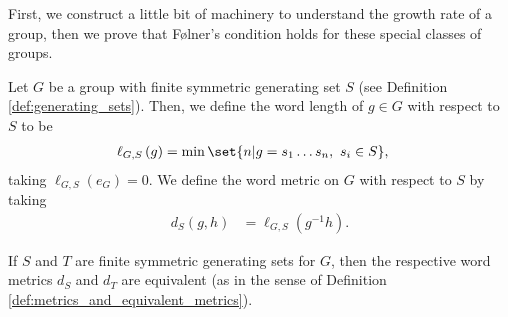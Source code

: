 \documentclass[10pt]{mypackage2}
\begin{document}
First, we construct a little bit of machinery to understand the growth rate of a group, then we prove that Følner's condition holds for these special classes of groups.
\begin{definition}\label{def:word_metric}
  Let $G$ be a group with finite symmetric generating set $S$ (see Definition \ref{def:generating_sets}). Then, we define the word length of $g\in G$ with respect to $S$ to be
  \begin{align*}
    \ell_{G,S}\left(g\right) &= \min\set{n | g = s_1\dots s_n,~s_i\in S},
  \end{align*}
  taking $\ell_{G,S}\left(e_G\right) = 0$. We define the word metric on $G$ with respect to $S$ by taking
  \begin{align*}
    d_{S}\left(g,h\right) &= \ell_{G,S}\left(g^{-1}h\right).
  \end{align*}
\end{definition}
\begin{fact}\label{fact:word_metric_equivalent_metrics}
  If $S$ and $T$ are finite symmetric generating sets for $G$, then the respective word metrics $d_{S}$ and $d_{T}$ are equivalent (as in the sense of Definition \ref{def:metrics_and_equivalent_metrics}).
\end{fact}
\end{document}
